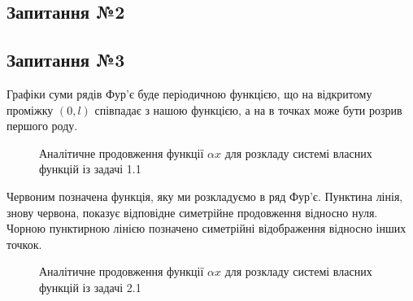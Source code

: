 \subsection*{Запитання №2}


\subsection*{Запитання №3} 
Графіки суми рядів Фур'є буде періодичною функцією, що на відкритому проміжку $(0,l)$ співпадає з нашою функцією, а на в точках може бути розрив першого роду.


\begin{figure} \label{fourier1}
    \caption{Аналітичне продовження функції $\alpha x$ для розкладу системі власних функцій із задачі 1.1}
\end{figure}

Червоним позначена функція, яку ми розкладуємо в ряд Фур'є. Пунктина лінія, знову червона, показує відповідне симетрійне продовження відносно нуля. Чорною пунктирною лінією позначено симетрійні відображення відносно інших точкок.

\begin{figure} \label{fourier2}
    \caption{Аналітичне продовження функції $\alpha x$ для розкладу системі власних функцій із задачі 2.1}
\end{figure}

%